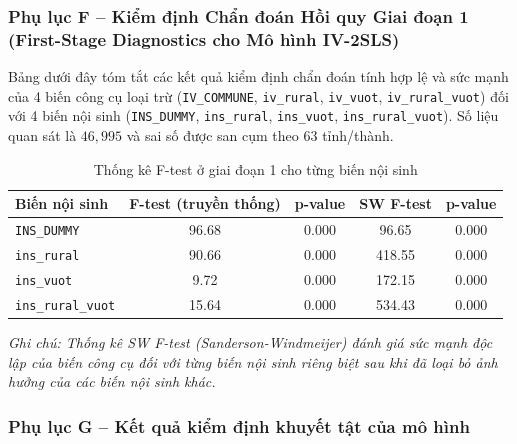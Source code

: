 \documentclass[12pt,a4paper]{article}
\begin{document}
\newpage
\subsubsection{Phụ lục F – Kiểm định Chẩn đoán Hồi quy Giai đoạn 1 (First-Stage Diagnostics cho Mô hình IV-2SLS)}

Bảng dưới đây tóm tắt các kết quả kiểm định chẩn đoán tính hợp lệ và sức mạnh của 4 biến công cụ loại trừ (\texttt{IV\_COMMUNE}, \texttt{iv\_rural}, \texttt{iv\_vuot}, \texttt{iv\_rural\_vuot}) đối với 4 biến nội sinh (\texttt{INS\_DUMMY}, \texttt{ins\_rural}, \texttt{ins\_vuot}, \texttt{ins\_rural\_vuot}). Số liệu quan sát là $46,995$ và sai số được san cụm theo $63$ tỉnh/thành.

\begin{table}[htbp]
	\centering
	\caption{Thống kê F-test ở giai đoạn 1 cho từng biến nội sinh}
	\label{tab:first_stage_f_tests}
	\begin{tabular}{lcccc}
		\toprule
		\textbf{Biến nội sinh} & \textbf{F-test (truyền thống)} & \textbf{p-value} & \textbf{SW F-test} & \textbf{p-value} \\
		\midrule
		\texttt{INS\_DUMMY} & 96.68 & 0.000 & 96.65 & 0.000 \\
		\texttt{ins\_rural} & 90.66 & 0.000 & 418.55 & 0.000 \\
		\texttt{ins\_vuot} & 9.72 & 0.000 & 172.15 & 0.000 \\
		\texttt{ins\_rural\_vuot} & 15.64 & 0.000 & 534.43 & 0.000 \\
		\bottomrule
	\end{tabular}
	
	\vspace{1ex}
	\raggedright \textit{\small Ghi chú: Thống kê SW F-test (Sanderson-Windmeijer) đánh giá sức mạnh độc lập của biến công cụ đối với từng biến nội sinh riêng biệt sau khi đã loại bỏ ảnh hưởng của các biến nội sinh khác.}
\end{table}


\newpage
\subsubsection{Phụ lục G – Kết quả kiểm định khuyết tật của mô hình}
	
\end{document}
